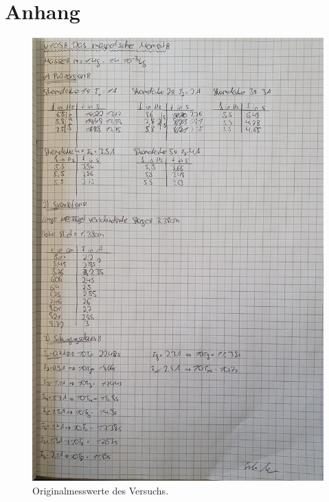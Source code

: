 \section{Anhang}

\begin{figure}[H]
    \centering
    \includegraphics[width=\textwidth]{Daten.jpg}
    \caption{Originalmesswerte des Versuchs.}
\end{figure}

%
